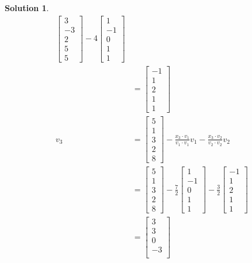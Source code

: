 \documentclass[11pt]{scrartcl}
\theoremstyle{dotlessP}
\newtheorem{sol}{Solution}[section]
\theoremstyle{dotlessN}
\begin{document}
\begin{sol}
\begin{align*}
\begin{bmatrix}
		3 \\
		-3 \\
		2 \\
		5 \\
		5
	\end{bmatrix} - 4
	\begin{bmatrix}
		1 \\
		-1 \\
		0 \\
		1 \\
		1
	\end{bmatrix} \\
		&= 
		\begin{bmatrix}
			-1 \\
			1 \\
			2 \\
			1 \\
			1
		\end{bmatrix} \\
	v_3 &= 
	\begin{bmatrix}
		5 \\
		1 \\
		3 \\
		2 \\
		8
	\end{bmatrix} - \frac{x_3 \cdot v_1}{v_1 \cdot v_1}v_1 - \frac{x_3 \cdot v_2}{v_2 \cdot v_2}v_2 \\
		&= 	\begin{bmatrix}
		5 \\
		1 \\
		3 \\
		2 \\
		8
	\end{bmatrix} - \frac{7}{2}
	\begin{bmatrix}
		1 \\
		-1 \\
		0 \\
		1 \\
		1
	\end{bmatrix} -
	\frac{3}{2}
	\begin{bmatrix}
		-1 \\
		1 \\
		2 \\
		1 \\
		1
	\end{bmatrix} \\
		&= 
		\begin{bmatrix}
			3 \\
			3 \\
			0 \\
			-3 \\

\end{bmatrix}
\end{align*}
\end{sol}
\end{document}
